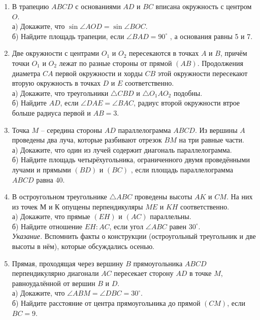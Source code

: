 \documentclass[12pt]{article}
\begin{document}
    \begin{enumerate}[start=1,label={\itshape\bfseries \arabic*.}]
        \item В трапецию $ABCD$ с основаниями $AD$ и $BC$ вписана окружность с центром $O$.\\
        а) Докажите, что  $\sin\angle AOD= \sin\angle BOC$.\\
        б) Найдите площадь трапеции, если $\angle BAD = 90^{\circ}$ , а основания равны 5 и 7.
        \item Две окружности с центрами $O_1$ и $O_2$ пересекаются в точках $A$ и $B$, причём точки $O_1$ и $O_2$ лежат по разные стороны от прямой $(AB)$. Продолжения диаметра $CA$ первой окружности и хорды $CB$ этой окружности пересекают вторую окружность в точках $D$ и $E$ соответственно.\\
        а) Докажите, что треугольники $\triangle CBD$ и $\triangle O_1 A O_2$ подобны.\\
        б) Найдите $AD$, если $\angle DAE = \angle BAC$, радиус второй окружности втрое больше радиуса первой и $AB = 3$.
        \item Точка $M$ -- середина стороны $AD$ параллелограмма $ABCD$. Из вершины $A$ проведены два луча, которые разбивают отрезок $BM$ на три равные части.\\
        а) Докажите, что один из лучей содержит диагональ параллелограмма.\\
        б) Найдите площадь четырёхугольника, ограниченного двумя проведёнными лучами и прямыми $(BD)$ и $(BC)$ , если площадь параллелограмма $ABCD$ равна 40.
        \item В остроугольном треугольнике $\triangle ABC$ проведены высоты $AK$ и $CM$. На них из точек $М$ и $К$ опущены перпендикуляры $ME$ и $KH$ соответственно.\\
        а) Докажите, что прямые $(EH)$ и $(AC)$ параллельны.\\
        б) Найдите отношение $EH : AC$, если угол $\angle ABC$ равен $30^{\circ}$.\\
        \textit{Указание.} Вспомнить факты о конструкции (остроугольный треугольник и две высоты в нём), которые обсуждались осенью.
        \item Прямая, проходящая через вершину $B$ прямоугольника $ABCD$ перпендикулярно диагонали $AC$ пересекает сторону $AD$ в точке $M$, равноудалённой от вершин $B$ и $D$.\\
        а) Докажите, что $\angle ABM = \angle DBC = 30^{\circ}$.\\
        б) Найдите расстояние от центра прямоугольника до прямой $(CM)$, если $BC = 9$.

 \end{enumerate}
\end{document}
